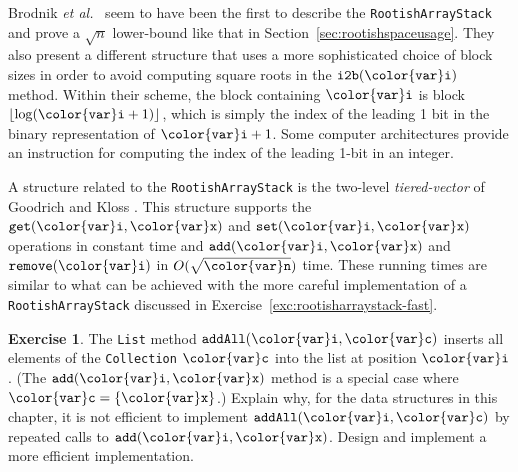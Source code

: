 \documentclass[10pt]{book}
\newcommand{\secref}[1]{Section~\ref{sec:#1}}
\theoremstyle{plain}
\theoremstyle{definition}
\newtheorem{exc}{Exercise}[chapter]
\newcommand{\excref}[1]{Exercise~\ref{exc:#1}}
\newcommand{\etal}{\emph{et al.}}
\begin{document}
Brodnik \etal\ \cite{bcdms99} seem to have been the first to describe
the \texttt{RootishArrayStack} and prove a $\sqrt{n}$ lower-bound like that
in \secref{rootishspaceusage}.  They also present a different structure
that uses a more sophisticated choice of block sizes in order to avoid
computing square roots in the \ensuremath{\mathtt{i2b({\color{var}i})}} method.  Within their scheme,
the block containing \ensuremath{\mathtt{{\color{var}i}}} is block $\lfloor\log (\ensuremath{\mathtt{{\color{var}i}}}+1)\rfloor$, which
is simply the index of the leading 1 bit in the binary representation
of $\ensuremath{\mathtt{{\color{var}i}}}+1$.  Some computer architectures provide an instruction for
computing the index of the leading 1-bit in an integer. 

A structure related to the \texttt{RootishArrayStack} is the two-level
\emph{tiered-vector} of Goodrich and Kloss \cite{gk99}.
%
This structure
supports the \ensuremath{\mathtt{get({\color{var}i},{\color{var}x})}} and \ensuremath{\mathtt{set({\color{var}i},{\color{var}x})}} operations in constant time and
\ensuremath{\mathtt{add({\color{var}i},{\color{var}x})}} and \ensuremath{\mathtt{remove({\color{var}i})}} in $O(\sqrt{\ensuremath{\mathtt{{\color{var}n}}}})$ time.  These running times
are similar to what can be achieved with the more careful implementation
of a \texttt{RootishArrayStack} discussed in \excref{rootisharraystack-fast}.


\begin{exc}
  The \texttt{List} method \ensuremath{\mathtt{addAll({\color{var}i},{\color{var}c})}} inserts all elements of the \texttt{Collection}
  \ensuremath{\mathtt{{\color{var}c}}} into the list at position \ensuremath{\mathtt{{\color{var}i}}}.  (The \ensuremath{\mathtt{add({\color{var}i},{\color{var}x})}} method is a special
  case where $\ensuremath{\mathtt{{\color{var}c}}}=\{\ensuremath{\mathtt{{\color{var}x}}}\}$.)  Explain why, for the data structures
  in this chapter, it is not efficient to implement \ensuremath{\mathtt{addAll({\color{var}i},{\color{var}c})}} by
  repeated calls to \ensuremath{\mathtt{add({\color{var}i},{\color{var}x})}}.  Design and implement a more efficient
  implementation.
\end{exc}
\end{document}
